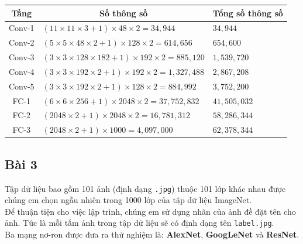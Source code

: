 \documentclass[a4paper]{article}
\begin{document}
\begin{table}[!h]
\centering
{\renewcommand{\arraystretch}{1.8}
\begin{tabular}{|c|l|l|}
\hline
\textbf{Tầng} & \multicolumn{1}{c|}{\textbf{Số thông số}} & \multicolumn{1}{c|}{\textbf{Tổng số thông số}}\\ \hline
Conv-1 & $(11 \times 11 \times 3 + 1)\times 48 \times 2 = 34,944$ & $34,944$ \\\hline
Conv-2 & $(5 \times 5 \times 48 \times 2 + 1)\times 128 \times 2 = 614,656$ & $654,600$ \\ \hline
Conv-3 & $(3 \times 3 \times 128 \times 182 + 1)\times 192 \times 2 = 885,120$ & $1,539,720$ \\ \hline
Conv-4 & $(3 \times 3 \times 192 \times 2 + 1)\times 192 \times 2 = 1,327,488$ & $2,867,208$ \\ \hline
Conv-5 & $(3 \times 3 \times 192 \times 2 + 1)\times 128 \times 2 = 884,992$ & $3,752,200$ \\ \hline
FC-1 & $(6 \times 6 \times 256 + 1)\times 2048 \times 2 = 37,752,832$ & $41,505,032$ \\ \hline
FC-2 & $(2048 \times 2 + 1)\times 2048 \times 2 = 16,781,312$ & $58,286,344$ \\ \hline
FC-3 & $(2048 \times 2 + 1)\times 1000 = 4,097,000$ & $62,378,344$ \\ \hline
\end{tabular}} \quad
\end{table}

\subsection{Bài 3}\label{bai3}
Tập dữ liệu bao gồm 101 ảnh (định dạng \texttt{.jpg}) thuộc 101 lớp khác nhau được chúng em chọn ngẫu nhiên trong 1000 lớp của tập dữ liệu ImageNet.\\
Để thuận tiện cho việc lập trình, chúng em sử dụng nhãn của ảnh đề đặt tên cho ảnh. Tức là mỗi tấm ảnh trong tập dữ liệu sẽ có định dạng tên \texttt{label.jpg}.\\
Ba mạng nơ-ron được đưa ra thử nghiệm là: \textbf{AlexNet}, \textbf{GoogLeNet} và \textbf{ResNet}.
\end{document}
